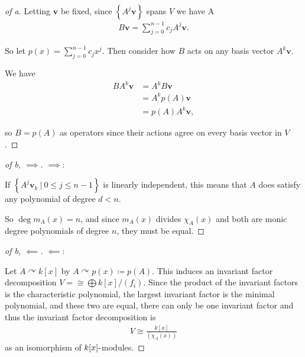 \begin{solution}

\envlist

\begin{proof}[of a]

Letting \(\mathbf{v}\) be fixed, since
\(\left\{{A^j \mathbf{v}}\right\}\) spans \(V\) we have A
\begin{align*}
B\mathbf{v} = \sum_{j=0}^{n-1}c_j A^j \mathbf{v}
.\end{align*}

So let \(p(x) = \sum_{j=0}^{n-1}c_jx^j\). Then consider how \(B\) acts
on any basis vector \(A^k \mathbf{v}\).

We have
\begin{align*}
BA^k \mathbf{v} 
&= A^k B\mathbf{v} \\
&= A^k p(A) \mathbf{v} \\
&= p(A) A^k \mathbf{v}
,\end{align*}

so \(B = p(A)\) as operators since their actions agree on every basis
vector in \(V\).

\end{proof}

\begin{proof}[of b, $\implies$]

\(\implies\):

If
\(\left\{{A^j \mathbf{v}_k {~\mathrel{\Big|}~}0\leq j \leq n-1}\right\}\)
is linearly independent, this means that \(A\) does satisfy any
polynomial of degree \(d < n\).

So \(\deg m_A(x) = n\), and since \(m_A(x)\) divides \(\chi_A(x)\) and
both are monic degree polynomials of degree \(n\), they must be equal.

\end{proof}

\begin{proof}[of b, $\impliedby$]

\(\impliedby\):

Let \(A\curvearrowright k[x]\) by
\(A \curvearrowright p(x) \coloneqq p(A)\). This induces an invariant
factor decomposition \(V =\cong \bigoplus k[x]/(f_i)\). Since the
product of the invariant factors is the characteristic polynomial, the
largest invariant factor is the minimal polynomial, and these two are
equal, there can only be one invariant factor and thus the invariant
factor decomposition is
\begin{align*}
V\cong \frac{k[x]}{(\chi_A(x))}
\end{align*}
as an isomorphism of \(k[x]{\hbox{-}}\)modules.


\end{proof}
\end{solution}
